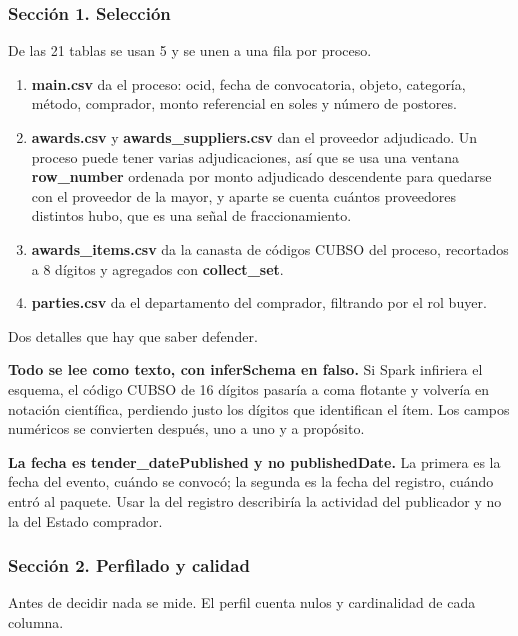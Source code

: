 \documentclass[11pt]{article}
\begin{document}
\subsubsection*{Sección 1. Selección}
De las 21 tablas se usan 5 y se unen a una fila por proceso.

\begin{enumerate}
  \item \textbf{main.csv} da el proceso: ocid, fecha de convocatoria, objeto, categoría, método, comprador, monto referencial en soles y número de postores.
  \item \textbf{awards.csv} y \textbf{awards\_\allowbreak{}suppliers.csv} dan el proveedor adjudicado. Un proceso puede tener varias adjudicaciones, así que se usa una ventana \textbf{row\_\allowbreak{}number} ordenada por monto adjudicado descendente para quedarse con el proveedor de la mayor, y aparte se cuenta cuántos proveedores distintos hubo, que es una señal de fraccionamiento.
  \item \textbf{awards\_\allowbreak{}items.csv} da la canasta de códigos CUBSO del proceso, recortados a 8 dígitos y agregados con \textbf{collect\_\allowbreak{}set}.
  \item \textbf{parties.csv} da el departamento del comprador, filtrando por el rol buyer.
\end{enumerate}
Dos detalles que hay que saber defender.

\textbf{Todo se lee como texto, con inferSchema en falso.} Si Spark infiriera el esquema, el código CUBSO de 16 dígitos pasaría a coma flotante y volvería en notación científica, perdiendo justo los dígitos que identifican el ítem. Los campos numéricos se convierten después, uno a uno y a propósito.

\textbf{La fecha es tender\_\allowbreak{}datePublished y no publishedDate.} La primera es la fecha del evento, cuándo se convocó; la segunda es la fecha del registro, cuándo entró al paquete. Usar la del registro describiría la actividad del publicador y no la del Estado comprador.

\subsubsection*{Sección 2. Perfilado y calidad}
Antes de decidir nada se mide. El perfil cuenta nulos y cardinalidad de cada columna.
\end{document}

